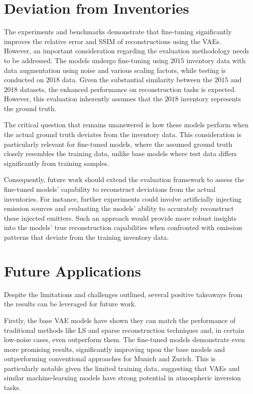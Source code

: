 \section{Deviation from Inventories}

The experiments and benchmarks demonstrate that fine-tuning significantly improves the relative error and \gls{SSIM} of reconstructions using the \gls{VAE}s.
However, an important consideration regarding the evaluation methodology needs to be addressed.
The models undergo fine-tuning using $2015$ inventory data with data augmentation using noise and various scaling factors, while testing is conducted on $2018$ data.
Given the substantial similarity between the $2015$ and $2018$ datasets, the enhanced performance on reconstruction tasks is expected.
However, this evaluation inherently assumes that the $2018$ inventory represents the ground truth.

The critical question that remains unanswered is how these models perform when the actual ground truth deviates from the inventory data.
This consideration is particularly relevant for fine-tuned models, where the assumed ground truth closely resembles the training data, unlike base models where test data differs significantly from training samples.

Consequently, future work should extend the evaluation framework to assess the fine-tuned models' capability to reconstruct deviations from the actual inventories.
For instance, further experiments could involve artificially injecting emission sources and evaluating the models' ability to accurately reconstruct these injected emitters.
Such an approach would provide more robust insights into the models' true reconstruction capabilities when confronted with emission patterns that deviate from the training inventory data.

\section{Future Applications}
Despite the limitations and challenges outlined, several positive takeaways from the results can be leveraged for future work.

Firstly, the base \gls{VAE} models have shown they can match the performance of traditional methods like \gls{LS} and sparse reconstruction techniques and, in certain low-noise cases, even outperform them.
The fine-tuned models demonstrate even more promising results, significantly improving upon the base models and outperforming conventional approaches for Munich and Zurich.
This is particularly notable given the limited training data, suggesting that \gls{VAE}s and similar machine-learning models have strong potential in atmospheric inversion tasks.

